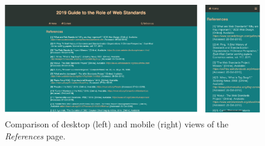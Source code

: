 \documentclass[letterpaper,12pt]{article}
\begin{document}
\begin{appendices}
\begin{figure}[h] 
\centerline{\includegraphics[width=\textwidth]{report/images/comparison-references.png}}
\caption{\label{fig:comparison-references}Comparison of desktop (left) and mobile (right) views of the \textit{References} page.}
\end{figure}

\end{appendices}
\end{document}
